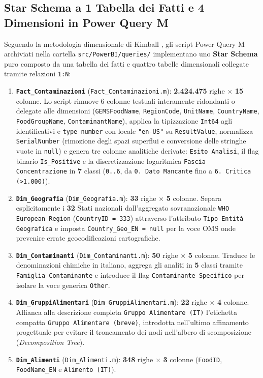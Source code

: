 \subsection{Star Schema a 1 Tabella dei Fatti e 4 Dimensioni in Power Query M}
Seguendo la metodologia dimensionale di Kimball \citep{kimball2013,powerbi_docs}, gli script Power Query M archiviati nella cartella \texttt{src/PowerBI/queries/} implementano uno \textbf{Star Schema} puro composto da una tabella dei fatti e quattro tabelle dimensionali collegate tramite relazioni \texttt{1:N}:
\begin{enumerate}
    \item \textbf{\texttt{Fact\_Contaminazioni}} (\texttt{Fact\_Contaminazioni.m}): \textbf{2.424.475} righe $\times$ \textbf{15} colonne. Lo script rimuove 6 colonne testuali interamente ridondanti o delegate alle dimensioni (\texttt{GEMSFoodName}, \texttt{RegionCode}, \texttt{UnitName}, \texttt{CountryName}, \texttt{FoodGroupName}, \texttt{ContaminantName}), applica la tipizzazione \texttt{Int64} agli identificativi e \texttt{type number} con locale \texttt{"en-US"} su \texttt{ResultValue}, normalizza \texttt{SerialNumber} (rimozione degli spazi superflui e conversione delle stringhe vuote in \texttt{null}) e genera tre colonne analitiche derivate: \texttt{Esito Analisi}, il flag binario \texttt{Is\_Positive} e la discretizzazione logaritmica \texttt{Fascia Concentrazione} in \textbf{7} classi (\texttt{0..6}, da \texttt{0. Dato Mancante} fino a \texttt{6. Critica (\textgreater{}1.000)}).
    \item \textbf{\texttt{Dim\_Geografia}} (\texttt{Dim\_Geografia.m}): \textbf{33} righe $\times$ \textbf{5} colonne. Separa esplicitamente i \textbf{32} Stati nazionali dall'aggregato sovranazionale \texttt{WHO European Region} (\texttt{CountryID = 333}) attraverso l'attributo \texttt{Tipo Entità Geografica} e imposta \texttt{Country\_Geo\_EN = null} per la voce OMS onde prevenire errate geocodificazioni cartografiche.
    \item \textbf{\texttt{Dim\_Contaminanti}} (\texttt{Dim\_Contaminanti.m}): \textbf{50} righe $\times$ \textbf{5} colonne. Traduce le denominazioni chimiche in italiano, aggrega gli analiti in \textbf{5} classi tramite \texttt{Famiglia Contaminante} e introduce il flag \texttt{Contaminante Specifico} per isolare la voce generica \texttt{Other}.
    \item \textbf{\texttt{Dim\_GruppiAlimentari}} (\texttt{Dim\_GruppiAlimentari.m}): \textbf{22} righe $\times$ \textbf{4} colonne. Affianca alla descrizione completa \texttt{Gruppo Alimentare (IT)} l'etichetta compatta \texttt{Gruppo Alimentare (breve)}, introdotta nell'ultimo affinamento progettuale per evitare il troncamento dei nodi nell'albero di scomposizione (\textit{Decomposition Tree}).
    \item \textbf{\texttt{Dim\_Alimenti}} (\texttt{Dim\_Alimenti.m}): \textbf{348} righe $\times$ \textbf{3} colonne (\texttt{FoodID}, \texttt{FoodName\_EN} e \texttt{Alimento (IT)}).
\end{enumerate}

